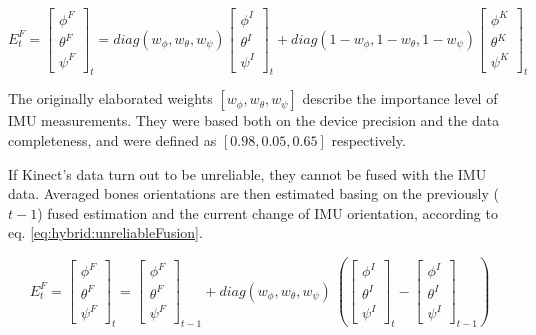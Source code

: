 \documentclass[sensors,article,submit,moreauthors,pdftex,10pt,a4paper]{mdpi}
\begin{document}
	\begin{equation} E^F_t = 
		\begin{bmatrix}  \phi^F \\  \theta^F \\  \psi^F \end{bmatrix}_t = 
		diag(w_\phi,w_\theta,w_\psi)
		\begin{bmatrix}  \phi^I \\  \theta^I \\  \psi^I \end{bmatrix}_t + 
		diag(1-w_\phi,1-w_\theta,1-w_\psi)
		\begin{bmatrix}  \phi^K \\  \theta^K \\  \psi^K \end{bmatrix}_t
		\label{eq:hybrid:reliableFusion}
	\end{equation}
		
	The originally elaborated weights $[w_\phi , w_\theta , w_\psi]$ describe the importance level of IMU measurements. They were based both on the device precision and the data completeness, and were defined as $[0.98, 0.05, 0.65]$ respectively. 
		
	If Kinect’s data turn out to be unreliable, they cannot be fused with the IMU data. Averaged bones orientations are then estimated basing on the previously ($t-1$) fused estimation and the current change of IMU orientation, according to eq. \ref{eq:hybrid:unreliableFusion}.
		
		
	\begin{equation} 
		\label{eq:hybrid:unreliableFusion}
		E^F_t = 
		\begin{bmatrix}  \phi^F \\  \theta^F \\  \psi^F \end{bmatrix}_t = 
		\begin{bmatrix}  \phi^F \\  \theta^F \\  \psi^F \end{bmatrix}_{t-1} +
		diag(w_\phi,w_\theta,w_\psi)\
		(\begin{bmatrix}  \phi^I \\  \theta^I \\  \psi^I \end{bmatrix}_t -
		\begin{bmatrix}  \phi^I \\  \theta^I \\  \psi^I \end{bmatrix}_{t-1})
	\end{equation}
		
\end{document}
